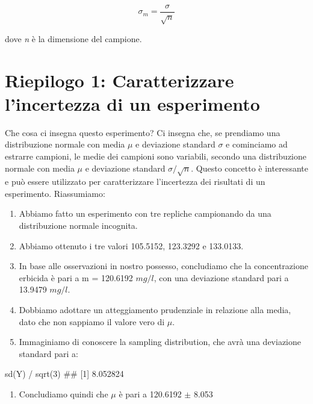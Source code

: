 \documentclass[a4paper,12pt,oneside]{book}
\providecommand{\tightlist}{%
  \setlength{\itemsep}{0pt}\setlength{\parskip}{0pt}}
\newenvironment{Shaded}{}{}
\newcommand{\KeywordTok}[1]{#1}
\newcommand{\DecValTok}[1]{#1}
\newcommand{\StringTok}[1]{#1}
\newcommand{\CommentTok}[1]{#1}
\newcommand{\OperatorTok}[1]{#1}
\newcommand{\NormalTok}[1]{#1}
\begin{document}
\[\sigma_m  = \frac{\sigma }{\sqrt n }\]

dove \emph{n} è la dimensione del campione.

\hypertarget{riepilogo-1-caratterizzare-lincertezza-di-un-esperimento}{%
\section{Riepilogo 1: Caratterizzare l'incertezza di un esperimento}\label{riepilogo-1-caratterizzare-lincertezza-di-un-esperimento}}

Che cosa ci insegna questo esperimento? Ci insegna che, se prendiamo una distribuzione normale con media \(\mu\) e deviazione standard \(\sigma\) e cominciamo ad estrarre campioni, le medie dei campioni sono variabili, secondo una distribuzione normale con media \(\mu\) e deviazione standard \(\sigma / \sqrt{n}\). Questo concetto è interessante e può essere utilizzato per caratterizzare l'incertezza dei risultati di un esperimento. Riassumiamo:

\begin{enumerate}
\def\labelenumi{\arabic{enumi}.}
\tightlist
\item
  Abbiamo fatto un esperimento con tre repliche campionando da una distribuzione normale incognita.
\item
  Abbiamo ottenuto i tre valori 105.5152, 123.3292 e 133.0133.
\item
  In base alle osservazioni in nostro possesso, concludiamo che la concentrazione erbicida è pari a m = 120.6192 \(mg/l\), con una deviazione standard pari a 13.9479 \(mg/l\).
\item
  Dobbiamo adottare un atteggiamento prudenziale in relazione alla media, dato che non sappiamo il valore vero di \(\mu\).
\item
  Immaginiamo di conoscere la sampling distribution, che avrà una deviazione standard pari a:
\end{enumerate}

\begin{Shaded}
\begin{Highlighting}[]
\KeywordTok{sd}\NormalTok{(Y) }\OperatorTok{/}\StringTok{ }\KeywordTok{sqrt}\NormalTok{(}\DecValTok{3}\NormalTok{)}
\CommentTok{## [1] 8.052824}
\end{Highlighting}
\end{Shaded}

\begin{enumerate}
\def\labelenumi{\arabic{enumi}.}
\setcounter{enumi}{5}
\tightlist
\item
  Concludiamo quindi che \(\mu\) è pari a 120.6192 \(\pm\) 8.053
\end{enumerate}
\end{document}
